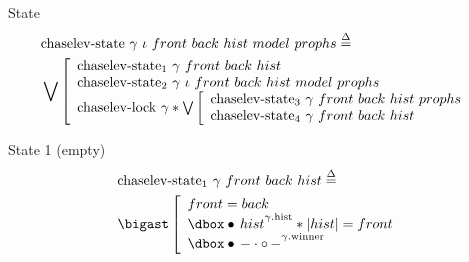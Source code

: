 \begin{frame}{State}
\small
\begin{align*}
		&\mathrm{chaselev \mathhyphen state}\ \gamma\ \iota\ front\ back\ hist\ model\ prophs
		\eqdef
	\\
		&\bigvee\left[\begin{array}{l}
				\mathrm{chaselev \mathhyphen state_1}\ \gamma\ front\ back\ hist
			\\
				\mathrm{chaselev \mathhyphen state_2}\ \gamma\ \iota\ front\ back\ hist\ model\ prophs
			\\
				\mathrm{chaselev \mathhyphen lock}\ \gamma \iSep
				\bigvee\left[\begin{array}{l}
						\mathrm{chaselev \mathhyphen state_3}\ \gamma\ front\ back\ hist\ prophs
					\\
						\mathrm{chaselev \mathhyphen state_4}\ \gamma\ front\ back\ hist
				\end{array}\right.
		\end{array}\right.
\end{align*}
\end{frame}


\begin{frame}{State 1 (empty)}
\begin{align*}
		&\mathrm{chaselev \mathhyphen state_1}\ \gamma\ front\ back\ hist
		\eqdef
	\\
		&\iBigsep\left[\begin{array}{l}
				front = back
			\\
				\iGhost{\gamma\mathrm{.hist}}{\iAuth{hist}} \iSep
				| hist | = front
			\\
				\iGhost{\gamma\mathrm{.winner}}{\iAuth{-} \cdot \iFrag{-}}
		\end{array}\right.
\end{align*}
\end{frame}


